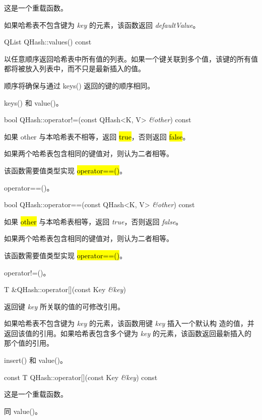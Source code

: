这是一个重载函数。

如果哈希表不包含键为 \emph{key} 的元素，该函数返回 \emph{defaultValue}。

QList QHash::values() const

以任意顺序返回哈希表中所有值的列表。如果一个键关联到多个值，该键的所有值都将被放入列表中，而不只是最新插入的值。

顺序将确保与通过 keys() 返回的键的顺序相同。

\begin{notice}[另请参阅]
keys() 和 value()。
\end{notice}



bool QHash::operator!=(const QHash<K, V> \emph{\&other}) const

如果 other 与本哈希表不相等，返回 \hl{true}，否则返回 \hl{false}。

如果两个哈希表包含相同的键值对，则认为二者相等。

该函数需要值类型实现 \hl{operator==()}。

\begin{notice}[另请参阅]
operator==()。
\end{notice}


bool QHash::operator==(const QHash<K, V> \emph{\&other}) const

如果 \hl{other} 与本哈希表相等，返回 \emph{true}，否则返回 \emph{false}。

如果两个哈希表包含相同的键值对，则认为二者相等。

该函数需要值类型实现 \hl{operator==()}。

\begin{notice}[另请参阅]
operator!=()。
\end{notice}


T \&QHash::operator[](const Key \emph{\&key})

返回键 \emph{key} 所关联的值的可修改引用。

如果哈希表不包含键为 \emph{key} 的元素，该函数用键 \emph{key} 插入一个默认构
造的值，并返回该值的引用。如果哈希表包含多个键为 \emph{key} 的元素，该函数返回最新插入的那个值的引用。

\begin{notice}[另请参阅]
insert() 和 value()。
\end{notice}


const T QHash::operator[](const Key \emph{\&key}) const

这是一个重载函数。

同 value()。

